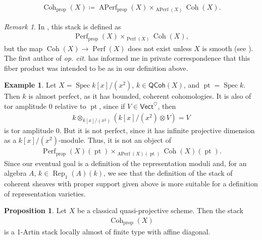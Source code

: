 \documentclass{article}
\numberwithin{equation}{section}
\theoremstyle{quest}
\theoremstyle{definition}
\newtheorem{prop}[thm]{Proposition}
\newtheorem{ex}[thm]{Example}
\theoremstyle{remark}
\newtheorem{rmk}[thm]{Remark}
\DeclareMathOperator{\Spec}{Spec}
\DeclareMathOperator{\pt}{pt}
\DeclareMathOperator{\Rep}{Rep}
\DeclareMathOperator{\Coh}{Coh}
\DeclareMathOperator{\Perf}{Perf}
\DeclareMathOperator{\APerf}{APerf}
\begin{document}
\begin{align*}
	\Coh_{\text{prop}}(X)\coloneqq \APerf_{\text{prop}}(X)\times _{\APerf(X)}\Coh(X).
\end{align*} 
\begin{rmk}
	In \cite{PS}, this stack is defined as
	\begin{align*}
		\Perf_{\text{prop}}(X)\times _{\Perf(X)}\Coh(X),
	\end{align*} 
	but the map $\Coh(X)\to \Perf(X)$ does not exist unless $X$ is smooth (see \cite[Lemma 2.18 and Corollary 2.19]{PS}). The first author of \textit{op. cit.} has informed me in private correspondence that this fiber product was intended to be as in our definition above.
\end{rmk} 
\begin{ex}
	Let $X=\Spec k[x]/(x^2)$, $k \in \mathsf{QCoh}(X)$, and $\pt = \Spec k$. Then $k$ is almost perfect, as it has bounded, coherent cohomologies. It is also of tor amplitude 0 relative to $\pt$, since if $V\in \mathsf{Vect}^\heartsuit$, then
	\begin{align*}
		k\otimes_{k[x]/(x^2)}(k[x]/(x^2)\otimes V) = V
	\end{align*} 
	is tor amplitude 0. But it is not perfect, since it has infinite projective dimension as a $k[x]/(x^2)$-module. Thus, it is not an object of
	\begin{align*}
		\Perf_{\text{prop}}(X)(\pt)\times _{\APerf(X)(\pt)}\Coh(X)(\pt).
	\end{align*} 
	Since our eventual goal is a definition of the representation moduli and, for an algebra $A$, $k\in \Rep_1(A)(k)$, we see that the definition of the stack of coherent sheaves with proper support given above is more suitable for a definition of representation varieties.
\end{ex}
\begin{prop}\label{prop:coherent-sheaves-with-proper-support-is-1-artin-laft-affine-diagonal}
	Let $X$ be a classical quasi-projective scheme. Then the stack
	\begin{align*}
		\Coh_{\text{prop}}(X)
	\end{align*} 
	is a 1-Artin stack locally almost of finite type with affine diagonal.
\end{prop} 
\end{document}
